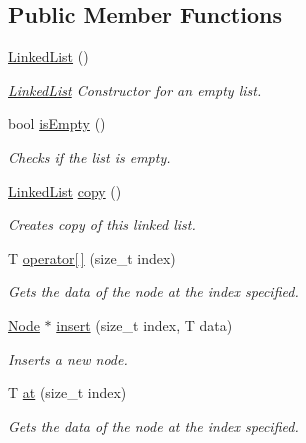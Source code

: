 \subsection*{Public Member Functions}
\begin{DoxyCompactItemize}
\item 
\mbox{\label{classLinkedList_a3c20fcfec867e867f541061a09fc640c}} 
\hyperlink{classLinkedList_a3c20fcfec867e867f541061a09fc640c}{Linked\+List} ()
\begin{DoxyCompactList}\small\item\em \hyperlink{classLinkedList}{Linked\+List} Constructor for an empty list. \end{DoxyCompactList}\item 
bool \hyperlink{classLinkedList_a7ecbb28e82117a680839ed0dc28ebdce}{is\+Empty} ()
\begin{DoxyCompactList}\small\item\em Checks if the list is empty. \end{DoxyCompactList}\item 
\hyperlink{classLinkedList}{Linked\+List} \hyperlink{classLinkedList_aadd88559a0e7e92c6a7da3e117b4e26f}{copy} ()
\begin{DoxyCompactList}\small\item\em Creates copy of this linked list. \end{DoxyCompactList}\item 
T \hyperlink{classLinkedList_a83a2aadda160e4f1160b35fd64f72207}{operator\mbox{[}$\,$\mbox{]}} (size\+\_\+t index)
\begin{DoxyCompactList}\small\item\em Gets the data of the node at the index specified. \end{DoxyCompactList}\item 
\hyperlink{structLinkedList_1_1Node}{Node} $\ast$ \hyperlink{classLinkedList_ae5e1ea8a9bbb18d9483db99b44479566}{insert} (size\+\_\+t index, T data)
\begin{DoxyCompactList}\small\item\em Inserts a new node. \end{DoxyCompactList}\item 
T \hyperlink{classLinkedList_a2793ba03677f44075c0529dffe0b0d5a}{at} (size\+\_\+t index)
\begin{DoxyCompactList}\small\item\em Gets the data of the node at the index specified. \end{DoxyCompactList}\item 

\end{DoxyCompactItemize}
